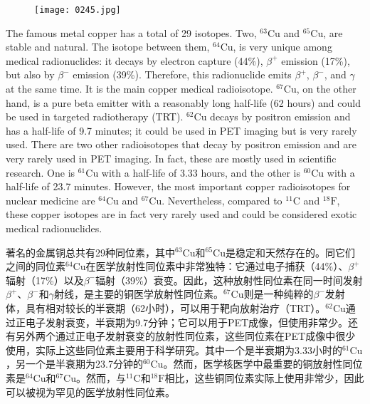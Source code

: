 \documentclass[dvipsnames, svgnames,a4paper,11pt]{article}
\begin{document}
\begin{figure}[h]
	\centering
    \texttt{[image: 0245.jpg]}  
     \label{fig327}
\end{figure}

The famous metal copper has a total of 29 isotopes. Two, \(\mathrm{^{63}Cu}\) and \(\mathrm{^{65}Cu}\), are stable and natural. The isotope between them, \(\mathrm{^{64}Cu}\), is very unique among medical radionuclides: it decays by electron capture (44\%), \(\beta^+\) emission (17\%), but also by \(\beta^-\) emission (39\%). Therefore, this radionuclide emits \(\beta^+\), \(\beta^-\), and \(\gamma\) at the same time. It is the main copper medical radioisotope. \(\mathrm{^{67}Cu}\), on the other hand, is a pure beta emitter with a reasonably long half-life (62 hours) and could be used in targeted radiotherapy (TRT). \(\mathrm{^{62}Cu}\) decays by positron emission and has a half-life of 9.7 minutes; it could be used in PET imaging but is very rarely used. There are two other radioisotopes that decay by positron emission and are very rarely used in PET imaging. In fact, these are mostly used in scientific research. One is \(\mathrm{^{61}Cu}\) with a half-life of 3.33 hours, and the other is \(\mathrm{^{60}Cu}\) with a half-life of 23.7 minutes. However, the most important copper radioisotopes for nuclear medicine are \(\mathrm{^{64}Cu}\) and \(\mathrm{^{67}Cu}\). Nevertheless, compared to \(\mathrm{^{11}C}\) and \(\mathrm{^{18}F}\), these copper isotopes are in fact very rarely used and could be considered exotic medical radionuclides.

著名的金属铜总共有29种同位素，其中\(\mathrm{^{63}Cu}\)和\(\mathrm{^{65}Cu}\)是稳定和天然存在的。同它们之间的同位素\(\mathrm{^{64}Cu}\)在医学放射性同位素中非常独特：它通过电子捕获（44\%）、\(\beta^+\)辐射（17\%）以及\(\beta^-\)辐射（39\%）衰变。因此，这种放射性同位素在同一时间发射\(\beta^+\)、\(\beta^-\)和\(\gamma\)射线，是主要的铜医学放射性同位素。\(\mathrm{^{67}Cu}\)则是一种纯粹的\(\beta^-\)发射体，具有相对较长的半衰期（62小时），可以用于靶向放射治疗（TRT）。\(\mathrm{^{62}Cu}\)通过正电子发射衰变，半衰期为9.7分钟；它可以用于PET成像，但使用非常少。还有另外两个通过正电子发射衰变的放射性同位素，这些同位素在PET成像中很少使用，实际上这些同位素主要用于科学研究。其中一个是半衰期为3.33小时的\(\mathrm{^{61}Cu}\)，另一个是半衰期为23.7分钟的\(\mathrm{^{60}Cu}\)。然而，医学核医学中最重要的铜放射性同位素是\(\mathrm{^{64}Cu}\)和\(\mathrm{^{67}Cu}\)。然而，与\(\mathrm{^{11}C}\)和\(\mathrm{^{18}F}\)相比，这些铜同位素实际上使用非常少，因此可以被视为罕见的医学放射性同位素。
\end{document}
